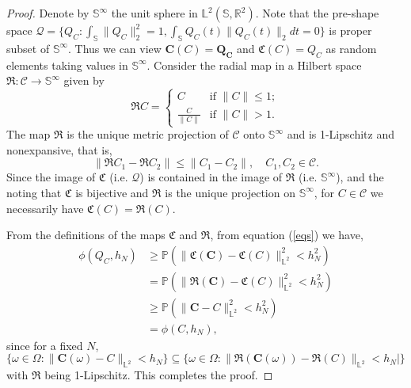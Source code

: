 \documentclass[11pt]{amsart}
\newcommand{\Rtwo}{\mathbb{R}^2}
\newcommand{\ltwo}{\mathbb{L}^2}
\newcommand{\uc}{\mathbb{S}}
\theoremstyle{definition}
\begin{document}
\begin{proof}
Denote by $\uc^\infty$ the unit sphere in $\mathbb{L}^2(\uc,\Rtwo)$. Note that the pre-shape space $\mathcal{Q}=\Big\{Q_C: \int_\uc \|Q_C\|_2^2=1, \int_\uc Q_C(t)\|Q_C(t)\|_2dt=0\Big\}$ is proper subset of $\uc^\infty$. Thus we can view $\mathfrak{\mathbf{C}}(C)=\mathbf{Q_C}$ and $\mathfrak{C}(C)=Q_C$ as random elements taking values in $\uc^\infty$.
Consider the radial map in a Hilbert space $\mathfrak{R}:\mathcal{C}\to \uc^\infty$ given by
\begin{equation*}
\mathfrak{R}C = \left\{ \begin{array}{ll}
         C & \mbox{if $\|C\| \leq  1$};\\
        \frac{C}{\|C\|} & \mbox{if $\|C\|>1$}.\end{array} \right. 
\end{equation*}
The map $\mathfrak{R}$ is the unique metric projection of $\mathcal{C}$ onto $\uc^\infty$ and is 1-Lipschitz and nonexpansive, that is, 
\[
\|\mathfrak{R}C_1 -\mathfrak{R}C_2\| \leq \|C_1-C_2\|, \quad C_1,C_2 \in \mathcal{C}.
\]
Since the image of $\mathfrak{C}$ (i.e. $\mathcal{Q}$) is contained in the image of $\mathfrak{R}$ (i.e. $\uc^\infty$), and the noting that $\mathfrak{C}$ is bijective and $\mathfrak{R}$ is the unique projection on $\uc^\infty$, for $C \in \mathcal{C}$ we necessarily have $\mathfrak{C}(C)=\mathfrak{R}(C)$.

From the definitions of the maps $\mathfrak{C}$ and $\mathfrak{R}$, from equation (\ref{eqs}) we have,
\begin{align*}
\phi(Q_C,h_N)&\geq\mathbb{P}\left(\|\mathfrak{C}(\mathbf{C})-\mathfrak{C}(C)\|_{\ltwo}^2<h^2_N\right)\\
&=\mathbb{P}\left(\|\mathfrak{R}(\mathbf{C})-\mathfrak{C}(C)\|_{\ltwo}^2<h^2_N\right)\\
&\geq \mathbb{P}\left(\|\mathbf{C}-C\|_{\ltwo}^2<h^2_N\right)\\
&=\phi(C,h_N),
\end{align*}
since for a fixed $N$, $\{\omega\in \Omega: \|\mathbf{C}(\omega)-C\|_{\ltwo}<h_N\}\subseteq\{\omega \in \Omega: \|\mathfrak{R}(\mathbf{C}(\omega))-\mathfrak{R}(C)\|_{\ltwo} <h_N|\}$ with $\mathfrak{R}$ being 1-Lipschitz. This completes the proof. 
\end{proof}


\end{document}
